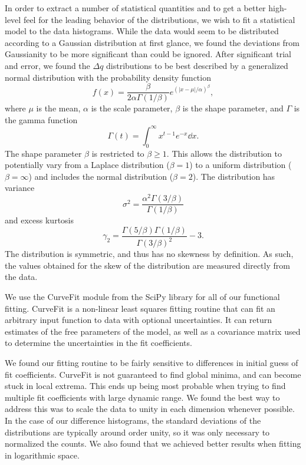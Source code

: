 In order to extract a number of statistical quantities and to get a better high-level feel for the leading behavior of the distributions, we wish to fit a statistical model to the data histograms.  While the data would seem to be distributed according to a Gaussian distribution at first glance, we found the deviations from Gaussianity to be more significant than could be ignored.  After significant trial and error, we found the $\Delta q$ distributions to be best described by a generalized normal distribution \citep{doi:10.1080/02664760500079464} with the probability density function
\begin{equation} \label{eq:analysis--generalized_normal}
	f(x) = \frac{ \beta }{2 \alpha \Gamma(1 / \beta)} e^{\left( \left| x - \mu \right| / \alpha \right)^{\beta}},
\end{equation}
where $\mu$ is the mean, $\alpha$ is the scale parameter, $\beta$ is the shape parameter, and $\Gamma$ is the gamma function
\begin{equation} \label{eq:analysis--gamma_function}
	\Gamma(t) = \int_{0}^{\infty} x^{t-1} e^{-x} \dd x.
\end{equation}
The shape parameter $\beta$ is restricted to $\beta \geq 1$.  This allows the distribution to potentially vary from a Laplace distribution ($\beta = 1$) to a uniform distribution ($\beta = \infty$) and includes the normal distribution ($\beta = 2$).  The distribution has variance
\begin{equation} \label{eq:analysis--variance}
	\sigma^{2} = \frac{ \alpha^{2} \Gamma(3/\beta) }{ \Gamma(1/\beta) }
\end{equation}
and excess kurtosis
\begin{equation} \label{eq:analysis--kurtosis}
	\gamma_{2} = \frac{ \Gamma(5/\beta) \Gamma(1/\beta) }{ \Gamma(3/\beta)^{2} } - 3.
\end{equation}
The distribution is symmetric, and thus has no skewness by definition.  As such, the values obtained for the skew of the distribution are measured directly from the data.

We use the CurveFit module from the SciPy library for all of our functional fitting.  CurveFit is a non-linear least squares fitting routine that can fit an arbitrary input function to data with optional uncertainties.  It can return estimates of the free parameters of the model, as well as a covariance matrix used to determine the uncertainties in the fit coefficients.

We found our fitting routine to be fairly sensitive to differences in initial guess of fit coefficients.  CurveFit is not guaranteed to find global minima, and can become stuck in local extrema.  This ends up being most probable when trying to find multiple fit coefficients with large dynamic range.  We found the best way to address this was to scale the data to unity in each dimension whenever possible.  In the case of our difference histograms, the standard deviations of the distributions are typically around order unity, so it was only necessary to normalized the counts.  We also found that we achieved better results when fitting in logarithmic space.

